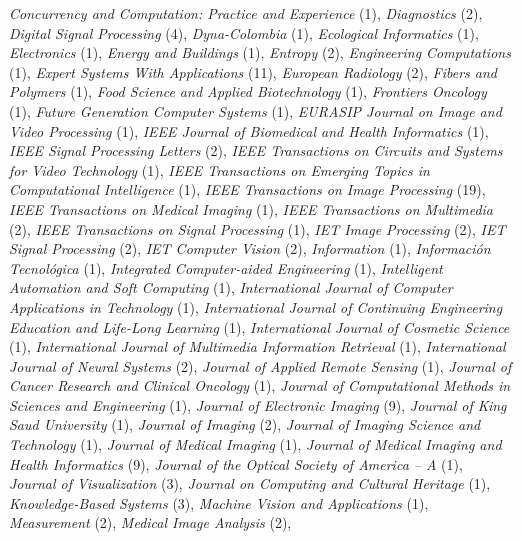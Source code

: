 \documentclass[11pt]{article}
\begin{document}
\begin{itemize}
    \emph{Concurrency and Computation: Practice and Experience} (1), 
    \emph{Diagnostics} (2),
    \emph{Digital Signal Processing} (4),
    \emph{Dyna-Colombia} (1),
    \emph{Ecological Informatics} (1),
    \emph{Electronics} (1),
    \emph{Energy and Buildings} (1),
    \emph{Entropy} (2),
    \emph{Engineering Computations} (1),
    \emph{Expert Systems With Applications} (11),
    \emph{European Radiology} (2),
    \emph{Fibers and Polymers} (1),
    \emph{Food Science and Applied Biotechnology} (1),
    \emph{Frontiers Oncology} (1),
    \emph{Future Generation Computer Systems} (1),
    \emph{EURASIP Journal on Image and Video Processing} (1),
    \emph{IEEE Journal of Biomedical and Health Informatics} (1),
    \emph{IEEE Signal Processing Letters} (2),
    \emph{IEEE Transactions on Circuits and Systems for Video Technology} (1),
    \emph{IEEE Transactions on Emerging Topics in Computational Intelligence} (1),
    \emph{IEEE Transactions on Image Processing} (19),
    \emph{IEEE Transactions on Medical Imaging} (1),
    \emph{IEEE Transactions on Multimedia} (2),
    \emph{IEEE Transactions on Signal Processing} (1),
    \emph{IET Image Processing} (2),
    \emph{IET Signal Processing} (2),
    \emph{IET Computer Vision} (2),
    \emph{Information} (1),
    \emph{Información Tecnológica} (1),
    \emph{Integrated Computer-aided Engineering} (1),
    \emph{Intelligent Automation and Soft Computing} (1),
    \emph{International Journal of Computer Applications in Technology} (1),
    \emph{International  Journal  of Continuing  Engineering  Education and  Life-Long Learning} (1),
    \emph{International Journal of Cosmetic Science} (1),
    \emph{International Journal of Multimedia Information Retrieval} (1),
    \emph{International Journal of Neural Systems} (2),
    \emph{Journal of Applied Remote Sensing} (1),
    \emph{Journal of Cancer Research and Clinical Oncology} (1),
    \emph{Journal of Computational Methods in Sciences and Engineering} (1),
    \emph{Journal of Electronic Imaging} (9),
		\emph{Journal of King Saud University} (1),
    \emph{Journal of Imaging} (2),
    \emph{Journal of Imaging Science and Technology} (1),
    \emph{Journal of Medical Imaging} (1),
    \emph{Journal of Medical Imaging and Health Informatics} (9),
    \emph{Journal of the Optical Society of America -- A} (1),
    \emph{Journal of Visualization} (3),
    \emph{Journal on Computing and Cultural Heritage} (1),
    \emph{Knowledge-Based Systems} (3),
    \emph{Machine Vision and Applications} (1),
    \emph{Measurement} (2),
		\emph{Medical Image Analysis} (2),

\end{itemize}
\end{document}
